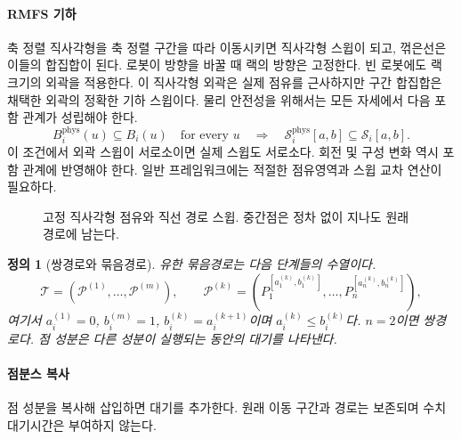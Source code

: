 \documentclass[11pt,a4paper]{article}
\newtheorem{definition}{정의}
\theoremstyle{remark}
\newcommand{\Sw}{\mathcal S}
\begin{document}
\paragraph{RMFS 기하}
축 정렬 직사각형을 축 정렬 구간을 따라 이동시키면 직사각형 스윕이 되고, 꺾은선은 이들의 합집합이 된다. 로봇이 방향을 바꿀 때 랙의 방향은 고정한다. 빈 로봇에도 랙 크기의 외곽을 적용한다. 이 직사각형 외곽은 실제 점유를 근사하지만 구간 합집합은 채택한 외곽의 정확한 기하 스윕이다. 물리 안전성을 위해서는 모든 자세에서 다음 포함 관계가 성립해야 한다.
\begin{equation}
 B_i^{\mathrm{phys}}(u)\subseteq B_i(u)\quad\text{for every }u
 \quad\Longrightarrow\quad
 \Sw_i^{\mathrm{phys}}[a,b]\subseteq\Sw_i[a,b].
 \label{eq:physical-envelope}
\end{equation}
이 조건에서 외곽 스윕이 서로소이면 실제 스윕도 서로소다. 회전 및 구성 변화 역시 포함 관계에 반영해야 한다. 일반 프레임워크에는 적절한 점유영역과 스윕 교차 연산이 필요하다.
\begin{figure}[htbp]
\centering
{}
\caption{고정 직사각형 점유와 직선 경로 스윕. 중간점은 정차 없이 지나도 원래 경로에 남는다.}
\label{fig:sweep}
\end{figure}

\begin{definition}[쌍경로와 묶음경로]
유한 묶음경로는 다음 단계들의 수열이다.
\begin{equation}
 \mathcal T=(\mathcal P^{(1)},\ldots,\mathcal P^{(m)}),\qquad
 \mathcal P^{(k)}=(P_1^{[a_1^{(k)},b_1^{(k)}]},\ldots,
                    P_n^{[a_n^{(k)},b_n^{(k)}]}),
 \label{eq:tuple}
\end{equation}
여기서 $a_i^{(1)}=0$, $b_i^{(m)}=1$, $b_i^{(k)}=a_i^{(k+1)}$이며 $a_i^{(k)}\le b_i^{(k)}$다. $n=2$이면 쌍경로다. 점 성분은 다른 성분이 실행되는 동안의 대기를 나타낸다.
\end{definition}
\paragraph{점분스 복사}
점 성분을 복사해 삽입하면 대기를 추가한다. 원래 이동 구간과 경로는 보존되며 수치 대기시간은 부여하지 않는다.
\end{document}
